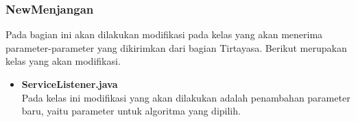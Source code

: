 \subsubsection{NewMenjangan}
Pada bagian ini akan dilakukan modifikasi pada kelas yang akan menerima parameter-parameter yang dikirimkan dari bagian Tirtayasa. Berikut merupakan kelas yang akan modifikasi.

\begin{itemize}
    \item \textbf{ServiceListener.java}
    \\ Pada kelas ini modifikasi yang akan dilakukan adalah penambahan parameter baru, yaitu parameter untuk algoritma yang dipilih.
\end{itemize}